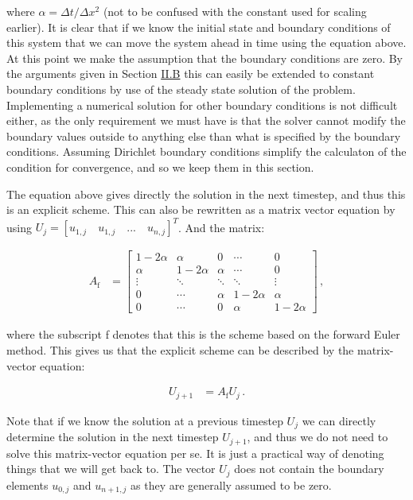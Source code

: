 \documentclass[reprint,english,notitlepage]{revtex4-1}  %
\begin{document}
where $\alpha = \Delta t /\Delta x^2$ (not to be confused with the constant used for scaling earlier). It is clear that if we know the initial state and boundary conditions of this system that we can move the system ahead in time using the equation above. At this point we make the assumption that the boundary conditions are zero. By the arguments given in Section \hyperref[sec:formalism_1D_diff_eq_analytical]{II.B} this can easily be extended to constant boundary conditions by use of the steady state solution of the problem. Implementing a numerical solution for other boundary conditions is not difficult either, as the only requirement we must have is that the solver cannot modify the boundary values outside to anything else than what is specified by the boundary conditions. Assuming Dirichlet boundary conditions simplify the calculaton of the condition for convergence, and so we keep them in this section.

The equation above gives directly the solution in the next timestep, and thus this is an explicit scheme. This can also be rewritten as a matrix vector equation by using $U_j = [u_{1,j} \quad u_{1,j} \quad ... \quad u_{n,j} ] ^T$. And the matrix:

\begin{align*}
A_\text{f} &= \begin{bmatrix}
1 - 2\alpha & \alpha & 0   &\cdots & 0 \\
\alpha & 1-2\alpha & \alpha   & \cdots & 0 \\
\vdots & \ddots & \ddots & \ddots  & \vdots \\
0 & \cdots  & \alpha & 1 - 2\alpha & \alpha \\
0 & \cdots & 0 & \alpha & 1 - 2\alpha 
\end{bmatrix} \, ,
\end{align*}

where the subscript f denotes that this is the scheme based on the forward Euler method. This gives us that the explicit scheme can be described by the matrix-vector equation:

\begin{align*}
U_{j+1} &= A_\text{f} U_{j} \, .
\end{align*}

Note that if we know the solution at a previous timestep $U_j$ we can directly determine the solution in the next timestep $U_{j+1}$, and thus we do not need to solve this matrix-vector equation per se. It is just a practical way of denoting things that we will get back to. The vector $U_j$ does not contain the boundary elements $u_{0,j}$ and $u_{n+1,j}$ as they are generally assumed to be zero.
\end{document}
